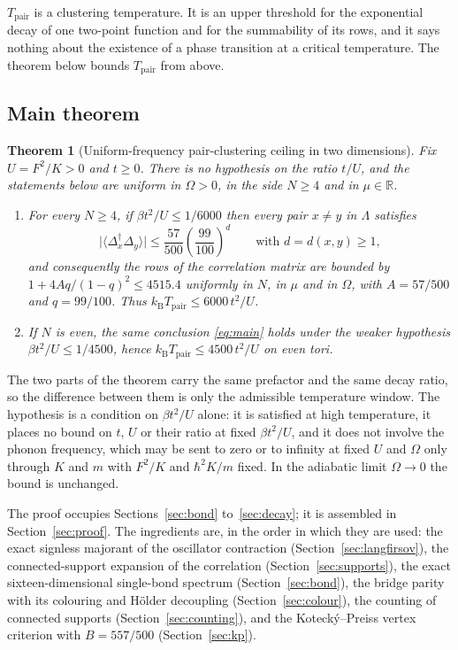 \documentclass[11pt]{article}
\theoremstyle{plain}
\newtheorem{theorem}{Theorem}
\theoremstyle{definition}
\newcommand{\Dop}{\Delta}
\begin{document}
$T_{\mathrm{pair}}$ is a clustering temperature. It is an upper threshold for the
exponential decay of one two-point function and for the summability of its rows, and
it says nothing about the existence of a phase transition at a critical temperature.
The theorem below bounds $T_{\mathrm{pair}}$ from above.

\subsection{Main theorem}\label{sec:main}

\begin{theorem}[Uniform-frequency pair-clustering ceiling in two
dimensions]\label{thm:main}
Fix $U=F^{2}/K>0$ and $t\ge0$. There is no hypothesis on the ratio $t/U$, and the
statements below are uniform in $\Omega>0$, in the side $N\ge4$ and in
$\mu\in\mathbb{R}$.
\begin{enumerate}
\item\label{it:all} For every $N\ge4$, if $\beta t^{2}/U\le1/6000$ then every pair
$x\ne y$ in $\Lambda$ satisfies
\begin{equation}\label{eq:main}
\bigl|\langle\Dop_x^\dagger\Dop_y\rangle\bigr|
\le\frac{57}{500}\left(\frac{99}{100}\right)^{d}
\qquad\text{with } d=d(x,y)\ge1,
\end{equation}
and consequently the rows of the correlation matrix are bounded by
$1+4A q/(1-q)^{2}\le4515.4$ uniformly in $N$, in $\mu$ and in $\Omega$, with
$A=57/500$ and $q=99/100$. Thus $k_{\mathrm{B}}T_{\mathrm{pair}}\le6000\,t^{2}/U$.
\item\label{it:even} If $N$ is even, the same conclusion \eqref{eq:main} holds under
the weaker hypothesis $\beta t^{2}/U\le1/4500$, hence
$k_{\mathrm{B}}T_{\mathrm{pair}}\le4500\,t^{2}/U$ on even tori.
\end{enumerate}
\end{theorem}

The two parts of the theorem carry the same prefactor and the same decay ratio, so
the difference between them is only the admissible temperature window. The
hypothesis is a condition on $\beta t^{2}/U$ alone: it is satisfied at high
temperature, it places no bound on $t$, $U$ or their ratio at fixed
$\beta t^{2}/U$, and it does not involve the phonon frequency, which may be sent to
zero or to infinity at fixed $U$ and $\Omega$ only through $K$ and $m$ with
$F^{2}/K$ and $\hbar^{2}K/m$ fixed. In the adiabatic limit $\Omega\to0$ the bound is
unchanged.

The proof occupies Sections~\ref{sec:bond} to~\ref{sec:decay}; it is assembled in
Section~\ref{sec:proof}. The ingredients are, in the order in which they are used:
the exact signless majorant of the oscillator contraction
(Section~\ref{sec:langfirsov}), the connected-support expansion of the correlation
(Section~\ref{sec:supports}), the exact sixteen-dimensional single-bond spectrum
(Section~\ref{sec:bond}), the bridge parity with its colouring and H\"older
decoupling (Section~\ref{sec:colour}), the counting of connected supports
(Section~\ref{sec:counting}), and the Koteck\'y--Preiss vertex criterion with
$B=557/500$ (Section~\ref{sec:kp}).
\end{document}
